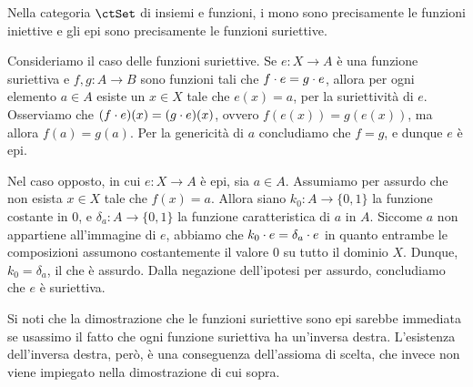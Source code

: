\begin{example}\label{monoepi_in_set}
 Nella categoria \(\ctSet\) di insiemi e funzioni, i mono sono precisamente le funzioni iniettive	e gli epi sono precisamente le funzioni suriettive.

 Consideriamo il caso delle funzioni suriettive.	Se \(e \colon X \to A\) è una funzione suriettiva e \(f, g \colon A \to B\) sono funzioni tali che \(f \cdot e = g \cdot e\),	allora per ogni elemento \(a \in A\) esiste un \(x \in X\) tale che \(e(x) = a\), per la suriettività di \(e\).	Osserviamo che \((f \cdot e)(x) = (g \cdot e)(x)\), ovvero \(f(e(x)) = g(e(x))\),	ma allora \(f(a) = g(a)\).	Per la genericità di \(a\) concludiamo che \(f = g\), e dunque \(e\) è epi.

 Nel caso opposto, in cui \(e \colon X \to A\) è epi, sia \(a \in A\).
 Assumiamo per assurdo che non esista \(x \in X\) tale che \(f(x) = a\).
 Allora siano \(k_0 \colon A \to \{0, 1\}\) la funzione costante in \(0\),
 e \(\delta_a \colon A \to \{0, 1\}\) la funzione caratteristica di \(a\) in \(A\).
 Siccome \(a\) non appartiene all'immagine di \(e\), abbiamo che \(k_0 \cdot e = \delta_a \cdot e\)
 in quanto entrambe le composizioni assumono costantemente il valore \(0\) su tutto il dominio \(X\).
 Dunque, \(k_0 = \delta_a\), il che è assurdo.
 Dalla negazione dell'ipotesi per assurdo, concludiamo che \(e\) è suriettiva.
\end{example}

Si noti che la dimostrazione che le funzioni suriettive sono epi sarebbe immediata
se usassimo il fatto che ogni funzione suriettiva ha un'inversa destra.
L'esistenza dell'inversa destra, però, è una conseguenza dell'assioma di scelta,
che invece non viene impiegato nella dimostrazione di cui sopra.

